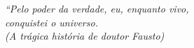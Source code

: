 \begin{epigrafe}
    \vspace*{\fill}
	\begin{flushright}
		\textit{``Pelo poder da verdade, eu, enquanto vivo,\\
		 conquistei o universo.\\
		(A trágica história de doutor Fausto)}
	\end{flushright}
\end{epigrafe}
